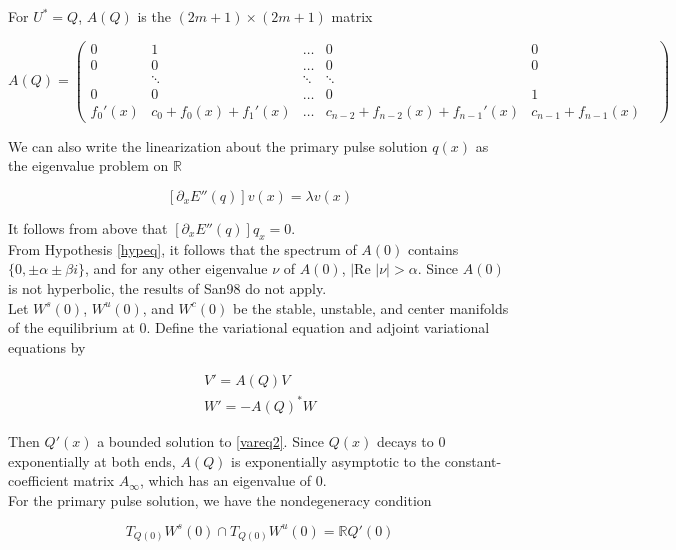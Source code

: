 \documentclass[12pt]{article}
\def\R{{\mathbb R}}
\begin{document}
For $U^* = Q$, $A(Q)$ is the $(2m+1) \times (2m+1)$ matrix

\begin{equation}
A(Q) = \begin{pmatrix}
0 & 1 & \dots & 0 & 0 \\
0 & 0 & \dots & 0 & 0 \\
& \ddots & \ddots & \ddots & & \\
0 & 0 & \dots & 0 & 1 \\
f_0'(x) & c_0 + f_0(x) + f_1'(x) & \dots & c_{n-2} + f_{n-2}(x) + f_{n-1}'(x) & c_{n-1} + f_{n-1}(x)
\end{pmatrix}
\end{equation}

We can also write the linearization about the primary pulse solution $q(x)$ as the eigenvalue problem on $\R$

\begin{equation}\label{eigonR}
[ \partial_x E''(q) ] v(x) = \lambda v(x)
\end{equation}

It follows from above that $[ \partial_x E''(q) ] q_x = 0$.
\\

From Hypothesis \ref{hypeq}, it follows that the spectrum of $A(0)$ contains $\{ 0, \pm \alpha \pm \beta i\}$, and for any other eigenvalue $\nu$ of $A(0)$, $|\text{Re }|\nu| > \alpha$. Since $A(0)$ is not hyperbolic, the results of San98 do not apply.\\

Let $W^s(0)$, $W^u(0)$, and $W^c(0)$ be the stable, unstable, and center manifolds of the equilibrium at 0. Define the variational equation and adjoint variational equations by

\begin{align}
V' = A(Q) V \label{vareq2} \\
W' = -A(Q)^* W \label{adjvareq2}
\end{align}

Then $Q'(x)$ a bounded solution to \eqref{vareq2}. Since $Q(x)$ decays to 0 exponentially at both ends, $A(Q)$ is exponentially asymptotic to the constant-coefficient matrix $A_\infty$, which has an eigenvalue of 0. \\

For the primary pulse solution, we have the nondegeneracy condition

\begin{equation}\label{nondegen2}
T_{Q(0)}W^s(0) \cap T_{Q(0)}W^u(0) = \R Q'(0)
\end{equation}
\end{document}
